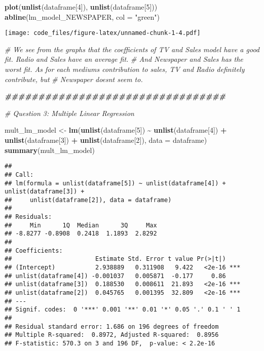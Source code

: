 \documentclass[
]{article}
\newenvironment{Shaded}{\begin{snugshade}}{\end{snugshade}}
\newcommand{\AttributeTok}[1]{\textcolor[rgb]{0.13,0.29,0.53}{#1}}
\newcommand{\CommentTok}[1]{\textcolor[rgb]{0.56,0.35,0.01}{\textit{#1}}}
\newcommand{\DecValTok}[1]{\textcolor[rgb]{0.00,0.00,0.81}{#1}}
\newcommand{\DocumentationTok}[1]{\textcolor[rgb]{0.56,0.35,0.01}{\textbf{\textit{#1}}}}
\newcommand{\FunctionTok}[1]{\textcolor[rgb]{0.13,0.29,0.53}{\textbf{#1}}}
\newcommand{\NormalTok}[1]{#1}
\newcommand{\OtherTok}[1]{\textcolor[rgb]{0.56,0.35,0.01}{#1}}
\newcommand{\SpecialCharTok}[1]{\textcolor[rgb]{0.81,0.36,0.00}{\textbf{#1}}}
\newcommand{\StringTok}[1]{\textcolor[rgb]{0.31,0.60,0.02}{#1}}
\begin{document}
\begin{Shaded}
\begin{Highlighting}[]
\FunctionTok{plot}\NormalTok{(}\FunctionTok{unlist}\NormalTok{(dataframe[}\DecValTok{4}\NormalTok{]), }\FunctionTok{unlist}\NormalTok{(dataframe[}\DecValTok{5}\NormalTok{]))}
\FunctionTok{abline}\NormalTok{(lm\_model\_NEWSPAPER, }\AttributeTok{col =} \StringTok{"green"}\NormalTok{)}
\end{Highlighting}
\end{Shaded}

\texttt{[image: code\_files/figure-latex/unnamed-chunk-1-4.pdf]}

\begin{Shaded}
\begin{Highlighting}[]
\CommentTok{\# We see from the graphs that the coefficients of TV and Sales model have a good fit. Radio and Sales have an average fit.}
\CommentTok{\# And Newspaper and Sales has the worst fit. As for each medium\textquotesingle{}s contribution to sales, TV and Radio definitely contribute, but}
\CommentTok{\# Newspaper doesn\textquotesingle{}t seem to. }

\DocumentationTok{\#\#\#\#\#\#\#\#\#\#\#\#\#\#\#\#\#\#\#\#\#\#\#\#\#\#\#\#\#\#\#\#\#}

\CommentTok{\# Question 3: Multiple Linear Regression}

\NormalTok{mult\_lm\_model }\OtherTok{\textless{}{-}} \FunctionTok{lm}\NormalTok{(}\FunctionTok{unlist}\NormalTok{(dataframe[}\DecValTok{5}\NormalTok{]) }\SpecialCharTok{\textasciitilde{}} \FunctionTok{unlist}\NormalTok{(dataframe[}\DecValTok{4}\NormalTok{]) }\SpecialCharTok{+} \FunctionTok{unlist}\NormalTok{(dataframe[}\DecValTok{3}\NormalTok{]) }\SpecialCharTok{+} \FunctionTok{unlist}\NormalTok{(dataframe[}\DecValTok{2}\NormalTok{]), }\AttributeTok{data =}\NormalTok{ dataframe)}
\FunctionTok{summary}\NormalTok{(mult\_lm\_model)}
\end{Highlighting}
\end{Shaded}

\begin{verbatim}
## 
## Call:
## lm(formula = unlist(dataframe[5]) ~ unlist(dataframe[4]) + unlist(dataframe[3]) + 
##     unlist(dataframe[2]), data = dataframe)
## 
## Residuals:
##     Min      1Q  Median      3Q     Max 
## -8.8277 -0.8908  0.2418  1.1893  2.8292 
## 
## Coefficients:
##                       Estimate Std. Error t value Pr(>|t|)    
## (Intercept)           2.938889   0.311908   9.422   <2e-16 ***
## unlist(dataframe[4]) -0.001037   0.005871  -0.177     0.86    
## unlist(dataframe[3])  0.188530   0.008611  21.893   <2e-16 ***
## unlist(dataframe[2])  0.045765   0.001395  32.809   <2e-16 ***
## ---
## Signif. codes:  0 '***' 0.001 '**' 0.01 '*' 0.05 '.' 0.1 ' ' 1
## 
## Residual standard error: 1.686 on 196 degrees of freedom
## Multiple R-squared:  0.8972, Adjusted R-squared:  0.8956 
## F-statistic: 570.3 on 3 and 196 DF,  p-value: < 2.2e-16
\end{verbatim}
\end{document}
